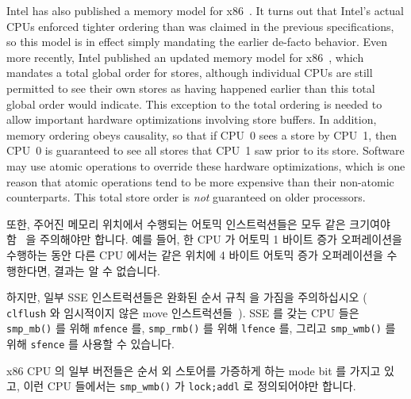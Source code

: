 Intel has also published a memory model for
x86~\cite{Intelx86MemoryOrdering2007}.
It turns out that Intel's actual CPUs enforced tighter ordering than
was claimed in the previous specifications, so this model is in effect
simply mandating the earlier de-facto behavior.
Even more recently, Intel published an updated memory model for
x86~\cite[Section 8.2]{Intel64IA32v3A2011}, which mandates a total global order
for stores, although individual CPUs are still permitted to see their
own stores as having happened earlier than this total global order
would indicate.
This exception to the total ordering is needed to allow important
hardware optimizations involving store buffers.
In addition, memory ordering obeys causality, so that if CPU~0 sees a
store by CPU~1, then CPU~0 is guaranteed to see all stores that CPU~1
saw prior to its store.
Software may use atomic operations to override these hardware optimizations,
which is one reason that atomic operations tend to be more expensive
than their non-atomic counterparts.
This total store order is \emph{not} guaranteed on older processors.
\fi

또한, 주어진 메모리 위치에서 수행되는 어토믹 인스트럭션들은 모두 같은 크기여야
함~\cite[Section 8.1.2.2]{Intel64IA32v3A2011} 을 주의해야만 합니다.
예를 들어, 한 CPU 가 어토믹 1 바이트 증가 오퍼레이션을 수행하는 동안 다른 CPU
에서는 같은 위치에 4 바이트 어토믹 증가 오퍼레이션을 수행한다면, 결과는 알 수
없습니다.

하지만, 일부 SSE 인스트럭션들은 완화된 순서 규칙 을 가짐을 주의하십시오 ({\tt
clflush} 와 임시적이지 않은 move 인스트럭션들~\cite{IntelXeonV2b-96a}).
SSE 를 갖는 CPU 들은 {\tt smp\_mb()} 를 위해 {\tt mfence} 를,
{\tt smp\_rmb()} 를 위해 {\tt lfence} 를, 그리고 {\tt smp\_wmb()} 를 위해
{\tt sfence} 를 사용할 수 있습니다.

x86 CPU 의 일부 버전들은 순서 외 스토어를 가증하게 하는 mode bit 를 가지고
있고, 이런 CPU 들에서는 {\tt smp\_wmb()} 가 {\tt lock;addl} 로 정의되어야만
합니다.

